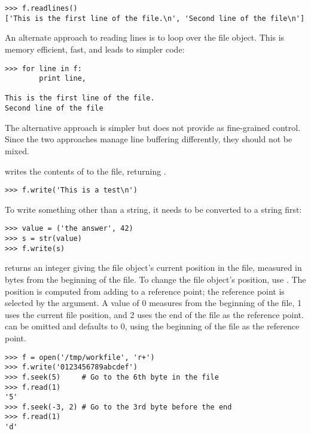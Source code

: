 \documentclass{manual}
\begin{document}
\begin{verbatim}
>>> f.readlines()
['This is the first line of the file.\n', 'Second line of the file\n']
\end{verbatim}

An alternate approach to reading lines is to loop over the file object.
This is memory efficient, fast, and leads to simpler code:

\begin{verbatim}
>>> for line in f:
        print line,
        
This is the first line of the file.
Second line of the file
\end{verbatim}

The alternative approach is simpler but does not provide as fine-grained
control.  Since the two approaches manage line buffering differently,
they should not be mixed.

 writes the contents of  to
the file, returning .  

\begin{verbatim}
>>> f.write('This is a test\n')
\end{verbatim}

To write something other than a string, it needs to be converted to a
string first:

\begin{verbatim}
>>> value = ('the answer', 42)
>>> s = str(value)
>>> f.write(s)
\end{verbatim}

 returns an integer giving the file object's current
position in the file, measured in bytes from the beginning of the
file.  To change the file object's position, use
.  The position is
computed from adding  to a reference point; the reference
point is selected by the  argument.  A
 value of 0 measures from the beginning of the file, 1
uses the current file position, and 2 uses the end of the file as the
reference point.   can be omitted and defaults to 0,
using the beginning of the file as the reference point.

\begin{verbatim}
>>> f = open('/tmp/workfile', 'r+')
>>> f.write('0123456789abcdef')
>>> f.seek(5)     # Go to the 6th byte in the file
>>> f.read(1)        
'5'
>>> f.seek(-3, 2) # Go to the 3rd byte before the end
>>> f.read(1)
'd'
\end{verbatim}
\end{document}
